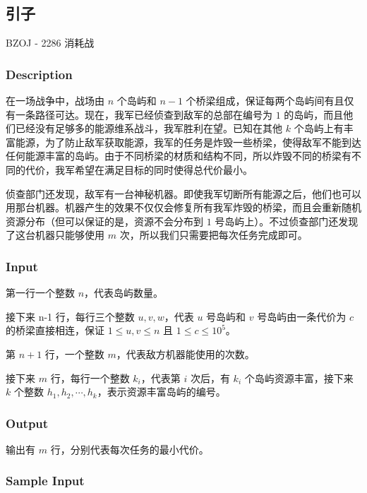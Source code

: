 
\subsection{引子}

\begin{NOTE}{BZOJ - 2286 消耗战}{}

\subsubsection{Description}

在一场战争中，战场由 $n$ 个岛屿和 $n-1$ 个桥梁组成，保证每两个岛屿间有且仅有一条路径可达。现在，我军已经侦查到敌军的总部在编号为 $1$ 的岛屿，而且他们已经没有足够多的能源维系战斗，我军胜利在望。已知在其他 $k$ 个岛屿上有丰富能源，为了防止敌军获取能源，我军的任务是炸毁一些桥梁，使得敌军不能到达任何能源丰富的岛屿。由于不同桥梁的材质和结构不同，所以炸毁不同的桥梁有不同的代价，我军希望在满足目标的同时使得总代价最小。

侦查部门还发现，敌军有一台神秘机器。即使我军切断所有能源之后，他们也可以用那台机器。机器产生的效果不仅仅会修复所有我军炸毁的桥梁，而且会重新随机资源分布（但可以保证的是，资源不会分布到 $1$ 号岛屿上）。不过侦查部门还发现了这台机器只能够使用 $m$ 次，所以我们只需要把每次任务完成即可。

\subsubsection{Input}

第一行一个整数 $n$，代表岛屿数量。

接下来 n-1 行，每行三个整数 $u,v,w$，代表 $u$ 号岛屿和 $v$ 号岛屿由一条代价为 $c$ 的桥梁直接相连，保证 $1\le u,v\le n$ 且 $1\le c\le 10^5$。

第 $n+1$ 行，一个整数 $m$，代表敌方机器能使用的次数。

接下来 $m$ 行，每行一个整数 $k_i$，代表第 $i$ 次后，有 $k_i$ 个岛屿资源丰富，接下来 $k$ 个整数 $h_1,h_2,\cdots ,h_k$，表示资源丰富岛屿的编号。

\subsubsection{Output}

输出有 $m$ 行，分别代表每次任务的最小代价。

\subsubsection{Sample Input}


\end{NOTE}
